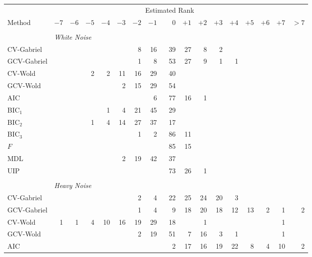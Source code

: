 \begin{table}
    \tiny
    \begin{tabular}{lrrrrrrrrrrrrrrrr}
        \toprule
        &\multicolumn{15}{c}{\scriptsize{Estimated Rank}} \\
        \cmidrule{2-17}
        \scriptsize{Method}
            & $-7$ & $-6$ & $-5$ & $-4$ & $-3$ & $-2$ & $-1$ 
            & $\phantom{+}0$ 
            & $+1$ & $+2$ & $+3$ & $+4$ & $+5$ & $+6$ & $+7$ & $> 7$ \\
        \midrule
        \\
        &\multicolumn{16}{l}{\scriptsize{\textit{White Noise}}} \\
CV-Gabriel &  &  &  &  &  &  8 &  16 &  39 &  27 &  8 &  2 &  &  &  &  & \\ 
 GCV-Gabriel &  &  &  &  &  &  1 &  8 &  53 &  27 &  9 &  1 &  1 &  &  &  & \\ 
 CV-Wold &  &  &  2 &  2 &  11 &  16 &  29 &  40 &  &  &  &  &  &  &  & \\ 
 GCV-Wold &  &  &  &  &  2 &  15 &  29 &  54 &  &  &  &  &  &  &  & \\ 
 AIC &  &  &  &  &  &  &  6 &  77 &  16 &  1 &  &  &  &  &  & \\ 
 BIC$_1$ &  &  &  &  1 &  4 &  21 &  45 &  29 &  &  &  &  &  &  &  & \\ 
 BIC$_2$ &  &  &  1 &  4 &  14 &  27 &  37 &  17 &  &  &  &  &  &  &  & \\ 
 BIC$_3$ &  &  &  &  &  &  1 &  2 &  86 &  11 &  &  &  &  &  &  & \\ 
 $F$ &  &  &  &  &  &  &  &  85 &  15 &  &  &  &  &  &  & \\ 
 MDL &  &  &  &  &  2 &  19 &  42 &  37 &  &  &  &  &  &  &  & \\ 
 UIP &  &  &  &  &  &  &  &  73 &  26 &  1 &  &  &  &  &  & \\ 
        \\
        &\multicolumn{16}{l}{\scriptsize{\textit{Heavy Noise}}} \\
CV-Gabriel &  &  &  &  &  &  2 &  4 &  22 &  25 &  24 &  20 &  3 &  &  &  & \\ 
 GCV-Gabriel &  &  &  &  &  &  1 &  4 &  9 &  18 &  20 &  18 &  12 &  13 &  2 &  1 &  2\\ 
 CV-Wold &  1 &  1 &  4 &  10 &  16 &  19 &  29 &  18 &  &  1 &  &  &  &  &  1 & \\ 
 GCV-Wold &  &  &  &  &  &  2 &  19 &  51 &  7 &  16 &  3 &  1 &  &  &  1 & \\ 
 AIC &  &  &  &  &  &  &  &  2 &  17 &  16 &  19 &  22 &  8 &  4 &  10 &  2\\ 

\end{tabular}
\end{table}
